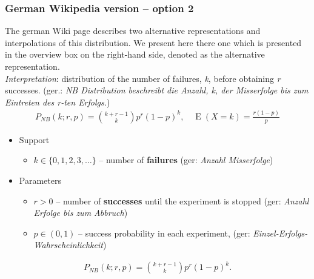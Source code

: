 \subsubsection*{German Wikipedia version -- option 2}
The german Wiki page describes two alternative representations and interpolations
of this distribution. We present here there one which is presented in the overview 
box on the right-hand side, denoted as the alternative representation.\\
\textit{Interpretation}: distribution of the number of failures, \emph{k}, before obtaining \emph{r} successes. 
(ger.: \emph{NB Distribution beschreibt die Anzahl, k, der Misserfolge bis zum Eintreten des r-ten Erfolgs.})
\begin{align*}
P_{N\!B}(k;r,p) = {k + r - 1 \choose k} p^r (1-p)^k, \quad \operatorname E(X\!=\!k)=\frac{r(1-p)}{p}
\end{align*}
\begin{itemize}
\item 
Support
\begin{itemize}
\item 
$k \in \{ 0, 1, 2, 3, \dots\}$ -- number of \textbf{failures} (ger: \emph{Anzahl Misserfolge})
\end{itemize}
\item 
Parameters 
\begin{itemize}
\item 
$r > 0$ -- number of \textbf{successes} until the experiment is stopped (ger: \emph{Anzahl Erfolge bis zum Abbruch})
\item 
$p \in (0,1)$ -- success probability in each experiment, (ger: \emph{Einzel-Erfolgs-Wahrscheinlichkeit})
\end{itemize}
\end{itemize}
\begin{align*}
P_{N\!B}(k;r,p) = {k + r - 1 \choose k} p^r (1-p)^k  .
\end{align*}

